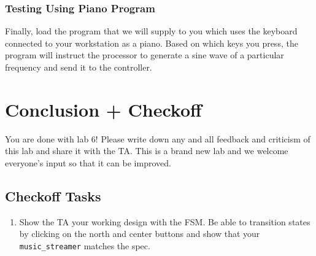 \documentclass[11pt]{article}
\begin{document}
\subsubsection{Testing Using Piano Program}
Finally, load the program that we will supply to you which uses the keyboard connected to your workstation as a piano. Based on which keys you press, the program will instruct the processor to generate a sine wave of a particular frequency and send it to the controller.


\section{Conclusion + Checkoff}
You are done with lab 6! Please write down any and all feedback and criticism of this lab and share it with the TA. This is a brand new lab and we welcome everyone's input so that it can be improved.\\

\subsection{Checkoff Tasks}

\begin{enumerate}
	\item Show the TA your working design with the FSM. Be able to transition states by clicking on the north and center buttons and show that your \verb|music_streamer| matches the spec.
\end{enumerate}
\end{document}
